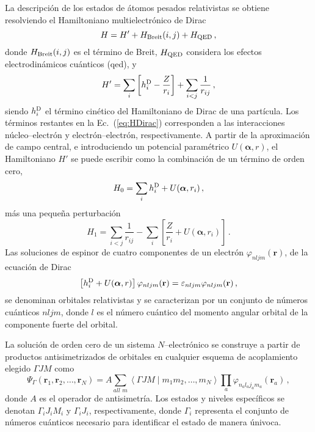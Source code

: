La descripción de los estados de átomos pesados relativistas se 
obtiene resolviendo el Hamiltoniano multielectrónico de 
Dirac~\cite{Klapisch:71,Klapisch:67,Klapisch:77,BarShalom:01}
\begin{equation}
 H = H' + H_{\mathrm{\mbox{\scriptsize Breit}}}(i,j) +
 H_{\mbox{\scriptsize QED}}\,,
\label{eq:htot}
\end{equation}
donde $H_{\mathrm{\mbox{\scriptsize Breit}}}(i,j)$ es el término de 
Breit, $H_{\mbox{\scriptsize QED}}$ considera los efectos 
electrodinámicos cuánticos (\acs{qed}), y
\begin{equation}
 H' = \sum_i \left[ h_i^{\mbox{\scriptsize D}} - \frac{Z}{r_i}\right]
 + \sum_{i<j}\frac{1}{r_{ij}}\,,
\label{eq:HDirac}
\end{equation}
siendo $h_i^{\mbox{\scriptsize D}}$ el término cinético del 
Hamiltoniano de Dirac de una partícula. Los términos restantes en la
Ec.~(\ref{eq:HDirac}) corresponden a las interacciones 
núcleo--electrón y electrón--electrón, respectivamente. A partir de la 
aproximación de campo central, e introduciendo un potencial paramétrico 
$U(\boldsymbol{\alpha},r)$, el Hamiltoniano $H'$ se puede escribir como 
la combinación de un término de orden cero, 
\begin{equation}
 H_0 = \sum_i h_i^{\mbox{\scriptsize D}} + U(\boldsymbol{\alpha},r_i)\,,
\end{equation}
más una pequeña perturbación
\begin{equation}
 H_1 = \sum_{i<j}\frac{1}{r_{ij}}
 - \sum_i \left[ \frac{Z}{r_i} + U(\boldsymbol{\alpha},r_i) \right]\,.
\end{equation}
Las soluciones de espinor de cuatro componentes de un electrón 
$\varphi_{nljm}(\mathbf{r})$, de la ecuación de Dirac
\begin{equation}
\left[ h_i^{\mbox{\scriptsize D}} +U(\boldsymbol{\alpha},r) \right] 
\varphi_{nljm}(\mathbf{r}) 
= \varepsilon_{nljm} \varphi_{nljm}(\mathbf{r})\,,
\label{eq:ecuacionDirac}
\end{equation}
se denominan orbitales relativistas y se caracterizan por un conjunto de 
números cuánticos $nljm$, donde $l$ es el número cuántico del momento 
angular orbital de la componente fuerte del orbital.

La solución de orden cero de un sistema $N$--electrónico se construye a 
partir de productos antisimetrizados de orbitales en cualquier esquema 
de acoplamiento elegido $\Gamma JM$ como 
\begin{equation}
\Psi_{\Gamma}\left(\mathbf{r}_1,\mathbf{r}_2,\ldots,\mathbf{r}_N\right)
=A\sum_{all\,\,m}\left\langle\Gamma JM\mid m_1 m_2,\ldots,m_{N}\right
\rangle \prod_{a} \varphi_{n_a l_a j_a m_a}\left(\mathbf{r}_a\right)\,,
\end{equation}
donde $A$ es el operador de antisimetría. Los estados y niveles 
específicos se denotan $\Gamma_iJ_iM_i$ y $\Gamma_iJ_i$, respectivamente,
donde $\Gamma_i$ representa el conjunto de números cuánticos necesario 
para identificar el estado de manera únivoca. 


